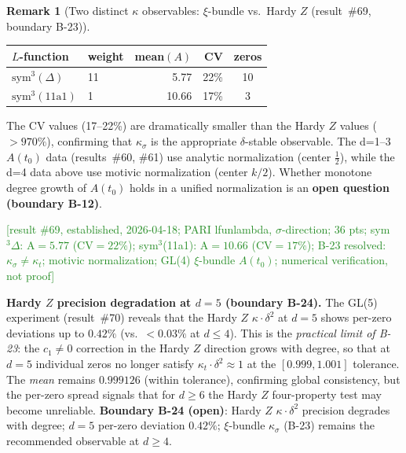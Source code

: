 \documentclass[11pt, a4paper]{article}
\theoremstyle{definition}
\newtheorem{remark}{Remark}[section]
\theoremstyle{plain}
\begin{document}
\begin{remark}[Two distinct $\kappa$ observables: $\xi$-bundle vs.\ Hardy $Z$ (result~\#69, boundary B-23)]
\begin{center}
\small
\begin{tabular}{@{}llrrc@{}}
\toprule
$L$-function & weight & mean$(A)$ & CV & zeros \\
\midrule
$\mathrm{sym}^3(\Delta)$ & 11 & 5.77 & 22\% & 10 \\
$\mathrm{sym}^3(11\mathrm{a}1)$ & 1 & 10.66 & 17\% & 3 \\
\bottomrule
\end{tabular}
\end{center}

\noindent The CV values (17--22\%) are dramatically smaller than the Hardy $Z$
values ($>970\%$), confirming that $\kappa_\sigma$ is the appropriate
$\delta$-stable observable.
The d=1--3 $A(t_0)$ data (results~\#60, \#61) use analytic normalization
(center $\tfrac{1}{2}$), while the d=4 data above use motivic normalization
(center $k/2$).
Whether monotone degree growth of $A(t_0)$ holds in a unified normalization
is an \textbf{open question (boundary B-12)}.

\textcolor{ForestGreen}{[result \#69, established, 2026-04-18;
PARI lfunlambda, $\sigma$-direction; 36 pts; sym$^3\Delta$: A${=}5.77$ (CV${=}22\%$);
sym$^3$(11a1): A${=}10.66$ (CV${=}17\%$);
B-23 resolved: $\kappa_\sigma \neq \kappa_t$; motivic normalization;
GL(4) $\xi$-bundle $A(t_0)$; numerical verification, not proof]}

\medskip\noindent
\textbf{Hardy $Z$ precision degradation at $d = 5$ (boundary B-24).}
The GL(5) experiment (result~\#70) reveals that the Hardy $Z$ $\kappa\cdot\delta^2$
at $d = 5$ shows per-zero deviations up to $0.42\%$ (vs.\ $< 0.03\%$ at $d \leq 4$).
This is the \emph{practical limit of B-23}: the $c_1 \neq 0$ correction in the Hardy $Z$
direction grows with degree, so that at $d = 5$ individual zeros no longer satisfy
$\kappa_t \cdot \delta^2 \approx 1$ at the $[0.999, 1.001]$ tolerance.
The \emph{mean} remains $0.999126$ (within tolerance), confirming global consistency,
but the per-zero spread signals that for $d \geq 6$ the Hardy $Z$ four-property test
may become unreliable.
\textbf{Boundary B-24 (open)}: Hardy $Z$ $\kappa\cdot\delta^2$ precision degrades with degree;
$d = 5$ per-zero deviation $0.42\%$; $\xi$-bundle $\kappa_\sigma$ (B-23) remains the
recommended observable at $d \geq 4$.
\end{remark}
\end{document}

